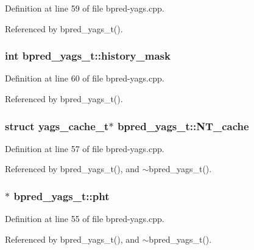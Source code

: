 Definition at line 59 of file bpred-yags.cpp.

Referenced by bpred\_\-yags\_\-t().
\subsubsection[{history\_\-mask}]{\setlength{\rightskip}{0pt plus 5cm}int {\bf bpred\_\-yags\_\-t::history\_\-mask}\hspace{0.3cm}{\tt  [protected]}}\label{classbpred__yags__t_f7427ee9ec3575b6bd95b286601c4295}




Definition at line 60 of file bpred-yags.cpp.

Referenced by bpred\_\-yags\_\-t().
\subsubsection[{NT\_\-cache}]{\setlength{\rightskip}{0pt plus 5cm}struct {\bf yags\_\-cache\_\-t}$\ast$ {\bf bpred\_\-yags\_\-t::NT\_\-cache}\hspace{0.3cm}{\tt  [read, protected]}}\label{classbpred__yags__t_f8938e58e803f5ef2ef6fd1a8664b870}




Definition at line 57 of file bpred-yags.cpp.

Referenced by bpred\_\-yags\_\-t(), and $\sim$bpred\_\-yags\_\-t().
\subsubsection[{pht}]{$\ast$ {\bf bpred\_\-yags\_\-t::pht}\hspace{0.3cm}{\tt  [protected]}}\label{classbpred__yags__t_fb8a366f0ef871c38acc38d6d5af1bd4}




Definition at line 55 of file bpred-yags.cpp.

Referenced by bpred\_\-yags\_\-t(), and $\sim$bpred\_\-yags\_\-t().
